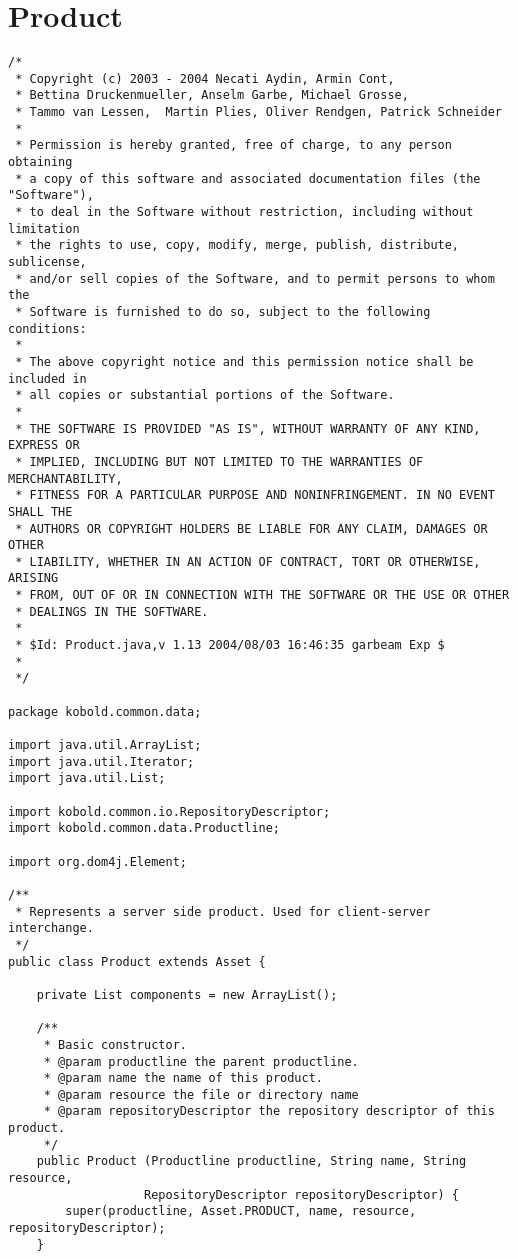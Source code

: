 \section{Product}
\small \begin{verbatim}
/*
 * Copyright (c) 2003 - 2004 Necati Aydin, Armin Cont, 
 * Bettina Druckenmueller, Anselm Garbe, Michael Grosse, 
 * Tammo van Lessen,  Martin Plies, Oliver Rendgen, Patrick Schneider
 * 
 * Permission is hereby granted, free of charge, to any person obtaining
 * a copy of this software and associated documentation files (the "Software"),
 * to deal in the Software without restriction, including without limitation
 * the rights to use, copy, modify, merge, publish, distribute, sublicense, 
 * and/or sell copies of the Software, and to permit persons to whom the 
 * Software is furnished to do so, subject to the following conditions:
 *
 * The above copyright notice and this permission notice shall be included in 
 * all copies or substantial portions of the Software.
 *
 * THE SOFTWARE IS PROVIDED "AS IS", WITHOUT WARRANTY OF ANY KIND, EXPRESS OR 
 * IMPLIED, INCLUDING BUT NOT LIMITED TO THE WARRANTIES OF MERCHANTABILITY, 
 * FITNESS FOR A PARTICULAR PURPOSE AND NONINFRINGEMENT. IN NO EVENT SHALL THE 
 * AUTHORS OR COPYRIGHT HOLDERS BE LIABLE FOR ANY CLAIM, DAMAGES OR OTHER 
 * LIABILITY, WHETHER IN AN ACTION OF CONTRACT, TORT OR OTHERWISE, ARISING 
 * FROM, OUT OF OR IN CONNECTION WITH THE SOFTWARE OR THE USE OR OTHER 
 * DEALINGS IN THE SOFTWARE.
 *
 * $Id: Product.java,v 1.13 2004/08/03 16:46:35 garbeam Exp $
 *
 */

package kobold.common.data;

import java.util.ArrayList;
import java.util.Iterator;
import java.util.List;

import kobold.common.io.RepositoryDescriptor;
import kobold.common.data.Productline;

import org.dom4j.Element;

/**
 * Represents a server side product. Used for client-server interchange.
 */
public class Product extends Asset {

	private List components = new ArrayList();
	
	/**
	 * Basic constructor.
	 * @param productline the parent productline.
	 * @param name the name of this product.
	 * @param resource the file or directory name
	 * @param repositoryDescriptor the repository descriptor of this product.
	 */
	public Product (Productline productline, String name, String resource,
	               RepositoryDescriptor repositoryDescriptor) {
		super(productline, Asset.PRODUCT, name, resource, repositoryDescriptor);
	}
	

\end{verbatim}
